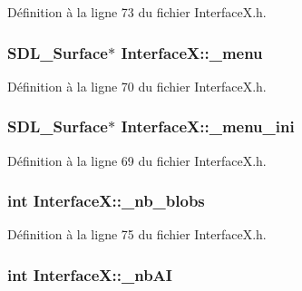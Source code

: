 Définition à la ligne 73 du fichier InterfaceX.h.

\hypertarget{a00011_af74c931698aacb8315ad7875a1968300}{
\subsubsection[{\_\-menu}]{\setlength{\rightskip}{0pt plus 5cm}SDL\_\-Surface$\ast$ {\bf InterfaceX::\_\-menu}}}
\label{a00011_af74c931698aacb8315ad7875a1968300}


Définition à la ligne 70 du fichier InterfaceX.h.

\hypertarget{a00011_a86bb002cf9b27e6362f2b48cc9bccf22}{
\subsubsection[{\_\-menu\_\-ini}]{\setlength{\rightskip}{0pt plus 5cm}SDL\_\-Surface$\ast$ {\bf InterfaceX::\_\-menu\_\-ini}}}
\label{a00011_a86bb002cf9b27e6362f2b48cc9bccf22}


Définition à la ligne 69 du fichier InterfaceX.h.

\hypertarget{a00011_ab7d7e603a5566ea712bcfe630f6dd231}{
\subsubsection[{\_\-nb\_\-blobs}]{\setlength{\rightskip}{0pt plus 5cm}int {\bf InterfaceX::\_\-nb\_\-blobs}}}
\label{a00011_ab7d7e603a5566ea712bcfe630f6dd231}


Définition à la ligne 75 du fichier InterfaceX.h.

\hypertarget{a00011_a9d9ba47a3441ea5ae681f1a9111a91af}{
\subsubsection[{\_\-nbAI}]{\setlength{\rightskip}{0pt plus 5cm}int {\bf InterfaceX::\_\-nbAI}}}
\label{a00011_a9d9ba47a3441ea5ae681f1a9111a91af}


